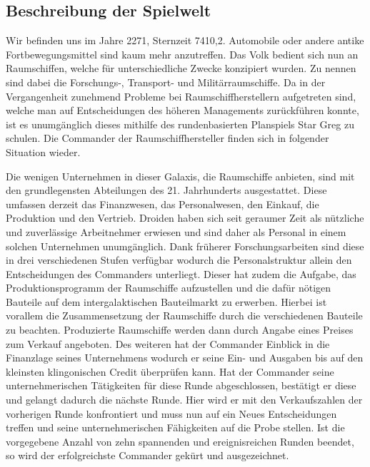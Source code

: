 \subsection{Beschreibung der Spielwelt}
\label{sec:spielwelt-szenario-spielwelt}

Wir befinden uns im Jahre 2271, Sternzeit 7410,2. Automobile oder andere antike Fortbewegungsmittel sind kaum mehr anzutreffen. Das Volk bedient sich nun an Raumschiffen, welche für unterschiedliche Zwecke konzipiert wurden. Zu nennen sind dabei die Forschungs-, Transport- und Militärraumschiffe. Da in der Vergangenheit zunehmend Probleme bei Raumschiffherstellern aufgetreten sind, welche man auf Entscheidungen des höheren Managements zurückführen konnte, ist es unumgänglich dieses mithilfe des rundenbasierten Planspiels Star Greg zu schulen. Die Commander der Raumschiffhersteller finden sich in folgender Situation wieder.

Die wenigen Unternehmen in dieser Galaxis, die Raumschiffe anbieten, sind mit den grundlegensten Abteilungen des 21. Jahrhunderts ausgestattet. Diese umfassen derzeit das Finanzwesen, das Personalwesen, den Einkauf, die Produktion und den Vertrieb. Droiden haben sich seit geraumer Zeit als nützliche und zuverlässige Arbeitnehmer erwiesen und sind daher als Personal in einem solchen Unternehmen unumgänglich. Dank früherer Forschungsarbeiten sind diese in drei verschiedenen Stufen verfügbar wodurch die Personalstruktur allein den Entscheidungen des Commanders unterliegt. Dieser hat zudem die Aufgabe, das Produktionsprogramm der Raumschiffe aufzustellen und die dafür nötigen Bauteile auf dem intergalaktischen Bauteilmarkt zu erwerben. Hierbei ist vorallem die Zusammensetzung der Raumschiffe durch die verschiedenen Bauteile zu beachten. Produzierte Raumschiffe werden dann durch Angabe eines Preises zum Verkauf angeboten. Des weiteren hat der Commander Einblick in die Finanzlage seines Unternehmens wodurch er seine Ein- und Ausgaben bis auf den kleinsten klingonischen Credit überprüfen kann. Hat der Commander seine unternehmerischen Tätigkeiten für diese Runde abgeschlossen, bestätigt er diese und gelangt dadurch die nächste Runde. Hier wird er mit den Verkaufszahlen der vorherigen Runde konfrontiert und muss nun auf ein Neues Entscheidungen treffen und seine unternehmerischen Fähigkeiten auf die Probe stellen. Ist die vorgegebene Anzahl von zehn spannenden und ereignisreichen Runden beendet, so wird der erfolgreichste Commander gekürt und ausgezeichnet.